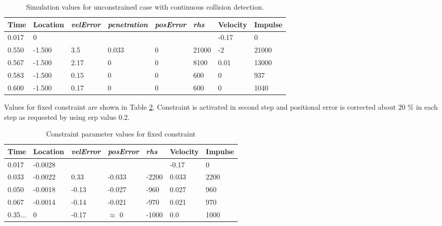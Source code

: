 \begin {table}[htb!]
\caption {Simulation values for unconstrained case with continuous collision detection. } 
\label{tab:freeBlockValuesWithCcd} 
\begin{center}
\begin{tabular}{|l| l|l| l|l|l|l|l|}
\hline
{\bf Time} & 
{\bf Location} &
{\it velError} & {\it penetration} & {\it posError} & {\it rhs} &
{\bf Velocity} & 
{\bf Impulse} \\  \hline
0.017 &  0 & & & &  &-0.17 & 0 \\  \hline
0.550 &  -1.500 & 3.5 & 0.033 & 0 & 21000& -2 & 21000 \\  \hline
0.567 &  -1.500 & 2.17 & 0 & 0  &  8100 & 0.01 & 13000 \\  \hline
0.583 &  -1.500 & 0.15 & 0 & 0 & 600  & 0 & 937 \\  \hline
0.600 &  -1.500 & 0.17 & 0 & 0 & 600  & 0 & 1040 \\  \hline
\end {tabular}
\end{center}
\end {table}

Values for fixed constraint are shown in Table
\ref{tab:fixedBlockValues}. Constraint is activated in second step and positional error is corrected
about 20 \% in each step as requested by using erp value 0.2.

\begin {table}[htb!]
\caption {Constraint parameter values for fixed constraint} 
\label{tab:fixedBlockValues} 
\begin{center}
\begin{tabular}{|l|l| l| l|l|l|l|}
\hline
{\bf Time} & 
{\bf Location} &
{\it velError} & {\it posError} & {\it rhs} &
{\bf Velocity} & 
{\bf Impulse} \\  \hline
0.017 & -0.0028 &  & & & -0.17 & 0 \\  \hline
0.033 & -0.0022 & 0.33 & -0.033 & -2200 & 0.033 & 2200 \\  \hline
0.050 & -0.0018 & -0.13 & -0.027 & -960 & 0.027 & 960 \\  \hline
0.067 & -0.0014 &-0.14 & -0.021 & -970 & 0.021 & 970 \\  \hline
0.35... & 0 &-0.17 & $\approx$ 0 & -1000 &0.0 & 1000 \\  \hline
\end {tabular}
\end{center}
\end {table}

